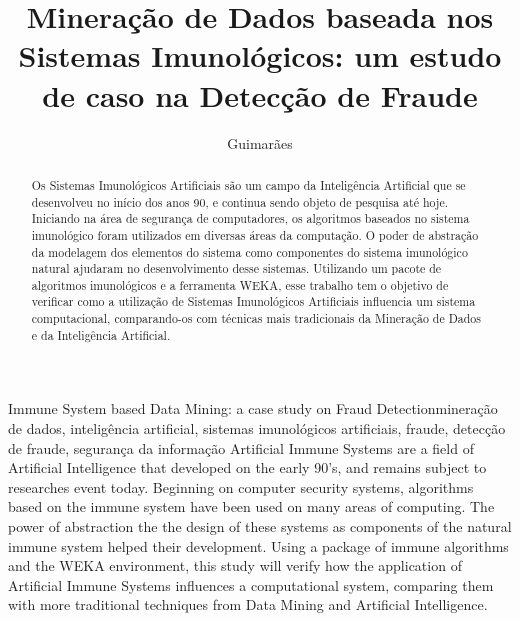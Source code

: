 \documentclass{iiufrgs}
\title{Mineração de Dados baseada nos Sistemas Imunológicos: um estudo de caso na Detecção de Fraude}
\author{Guimarães}{Bruno Barcarol}
\begin{document}
\maketitle

\tableofcontents

\listoffigures

\listoftables

\printnomenclature

\begin{abstract}
    Os Sistemas Imunológicos Artificiais são um campo da Inteligência Artificial que se desenvolveu no início dos anos 90, e continua sendo objeto de pesquisa até hoje. Iniciando na área de segurança de computadores, os algoritmos baseados no sistema imunológico foram utilizados em diversas áreas da computação. O poder de abstração da modelagem dos elementos do sistema como componentes do sistema imunológico natural ajudaram no desenvolvimento desse sistemas. Utilizando um pacote de algoritmos imunológicos e a ferramenta WEKA, esse trabalho tem o objetivo de verificar como a utilização de Sistemas Imunológicos Artificiais influencia um sistema computacional, comparando-os com técnicas mais tradicionais da Mineração de Dados e da Inteligência Artificial.
\end{abstract}

\begin{englishabstract}{Immune System based Data Mining: a case study on Fraud Detection}{mineração de dados, inteligência artificial, sistemas imunológicos artificiais, fraude, detecção de fraude, segurança da informação}
    Artificial Immune Systems are a field of Artificial Intelligence that developed on the early 90's, and remains subject to researches event today. Beginning on computer security systems, algorithms based on the immune system have been used on many areas of computing. The power of abstraction the the design of these systems as components of the natural immune system helped their development. Using a package of immune algorithms and the WEKA environment, this study will verify how the application of Artificial Immune Systems influences a computational system, comparing them with more traditional techniques from Data Mining and Artificial Intelligence.
\end{englishabstract}










\end{document}
